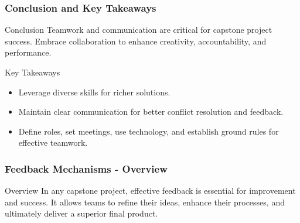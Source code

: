 \documentclass{beamer}
\begin{document}
\begin{frame}[fragile]
    \frametitle{Conclusion and Key Takeaways}
    \begin{block}{Conclusion}
        Teamwork and communication are critical for capstone project success. Embrace collaboration to enhance creativity, accountability, and performance.
    \end{block}

    \begin{block}{Key Takeaways}
        \begin{itemize}
            \item Leverage diverse skills for richer solutions.
            \item Maintain clear communication for better conflict resolution and feedback.
            \item Define roles, set meetings, use technology, and establish ground rules for effective teamwork.
        \end{itemize}
    \end{block}
\end{frame}

\begin{frame}[fragile]
    \frametitle{Feedback Mechanisms - Overview}
    \begin{block}{Overview}
        In any capstone project, effective feedback is essential for improvement and success. It allows teams to refine their ideas, enhance their processes, and ultimately deliver a superior final product.
    \end{block}
\end{frame}
\end{document}
